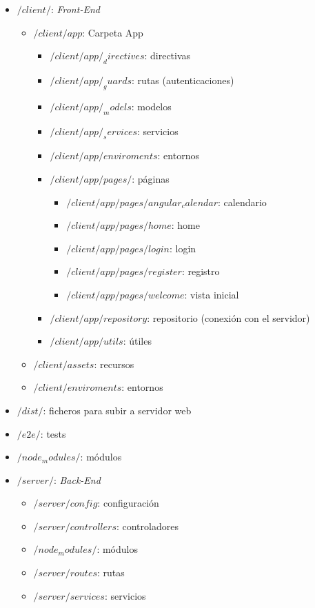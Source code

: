 \begin{itemize}
	\item \textbf{$/client/$}: \emph{Front-End} 
	\begin{itemize}
	\item \textbf{$/client/app$}: Carpeta App
		\begin{itemize}
		\item \textbf{$/client/app/ _directives$}: directivas
		\item \textbf{$/client/app/ _guards$}: rutas (autenticaciones)
		\item \textbf{$/client/app/ _models$}: modelos
		\item \textbf{$/client/app/ _services$}:  servicios
		\item \textbf{$/client/app/enviroments$}:  entornos
		\item \textbf{$/client/app/pages/$}:  páginas
			\begin{itemize}
			\item \textbf{$/client/app/pages/angular_calendar $}:  calendario
			\item \textbf{$/client/app/pages/home $}:   home
			\item \textbf{$/client/app/pages/login $}:  login
			\item \textbf{$/client/app/pages/register $}:   registro
			\item \textbf{$/client/app/pages/welcome $}:   vista inicial
			\end{itemize}
		\item \textbf{$/client/app/repository $}:  repositorio (conexión con el servidor)
		\item \textbf{$/client/app/utils $}:   útiles
		\end{itemize}
	\item \textbf{$/client/assets $}: recursos  
	\item \textbf{$/client/enviroments $}:  entornos
   \end{itemize}
	\item \textbf{$/dist/ $}: ficheros para subir a servidor web
	\item \textbf{$/e2e/ $}: tests
	\item \textbf{$/node_modules/ $}: módulos
	\item \textbf{$/server/ $}:  \emph{Back-End} 
		\begin{itemize}
			\item \textbf{$/server/config $}: configuración
			\item \textbf{$/server/controllers $}: controladores
			\item \textbf{$/node_modules/ $}: módulos
			\item \textbf{$/server/routes $}: rutas
			\item \textbf{$/server/services $}: servicios
		\end{itemize}
\end{itemize}

